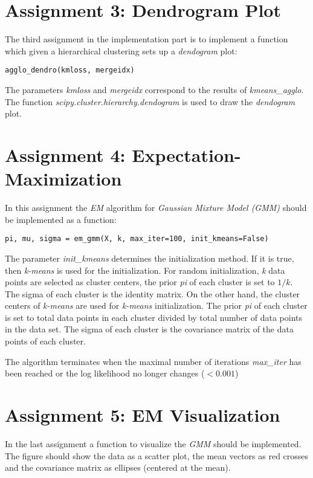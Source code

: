 \section{Assignment 3: Dendrogram Plot}
\label{sec:assignment3}

The third assignment in the implementation part is to implement a function which given a hierarchical clustering sets up a \textit{dendogram} plot:

\begin{center}
\texttt{agglo\_dendro(kmloss, mergeidx)}
\end{center}

The parameters \textit{kmloss} and \textit{mergeidx} correspond to the results of \textit{kmeans\_agglo}. The function \textit{scipy.cluster.hierarchy.dendogram} is used to draw the \textit{dendogram} plot.

\section{Assignment 4: Expectation-Maximization}
\label{sec:assignment4}

In this assignment the \textit{EM} algorithm for \textit{Gaussian Mixture Model (GMM)} should be implemented as a function:

\begin{center}
\texttt{pi, mu, sigma = em\_gmm(X, k, max\_iter=100, init\_kmeans=False)}
\end{center}

The parameter \textit{init\_kmeans} determines the initialization method. If it is true, then \textit{k-means} is used for the initialization. For random initialization, \textit{k} data points are selected as cluster centers, the prior \textit{pi} of each cluster is set to $1 / k$. The sigma of each cluster is the identity matrix. On the other hand, the cluster centers of \textit{k-means} are used for \textit{k-means} initialization. The prior \textit{pi} of each cluster is set to total data points in each cluster divided by total number of data points in the data set. The sigma of each cluster is the covariance matrix of the data points of each cluster.


The algorithm terminates when the maximal number of iterations \textit{max\_iter} has been reached or the log likelihood no longer changes ($<0.001$)


\section{Assignment 5: EM Visualization}
\label{sec:assignment5}

In the last assignment a function to visualize the \textit{GMM} should be implemented. The figure should show the data as a scatter plot, the mean vectors as red crosses and the covariance matrix as ellipses (centered at the mean).